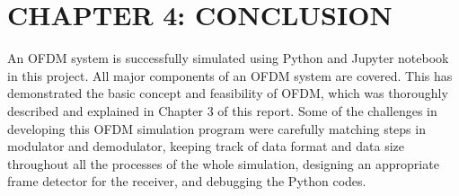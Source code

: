 \section*{CHAPTER 4: CONCLUSION}
\setcounter{section}{2}
\setcounter{subsection}{0}
\setcounter{figure}{0}
\setcounter{table}{0}

An OFDM system is successfully simulated using Python and Jupyter notebook in this project. All major components of an OFDM system are covered. This has demonstrated the basic concept and feasibility of OFDM, which was thoroughly described and explained in Chapter 3 of this report. Some of the challenges in developing this OFDM simulation program were carefully matching steps in modulator and demodulator, keeping track of data format and data size throughout all the processes of the whole simulation, designing an appropriate frame detector for the receiver, and debugging the Python codes.